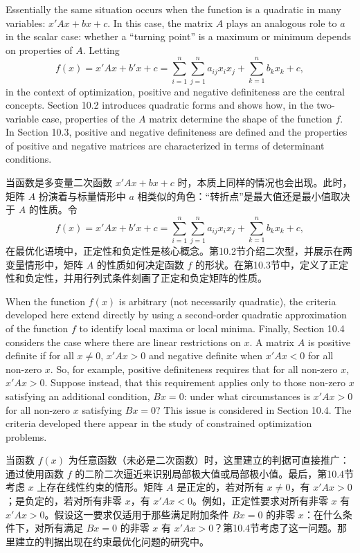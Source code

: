 \begin{original}
Essentially the same situation occurs when the function is a quadratic in many variables: $x'Ax + bx + c$. In this case, the matrix $A$ plays an analogous role to $a$ in the scalar case: whether a ``turning point'' is a maximum or minimum depends on properties of $A$. Letting
\[
f(x) = x'Ax + b'x + c = \sum_{i=1}^n \sum_{j=1}^n a_{ij} x_i x_j + \sum_{k=1}^n b_k x_k + c,
\]
in the context of optimization, positive and negative definiteness are the central concepts. Section 10.2 introduces quadratic forms and shows how, in the two-variable case, properties of the $A$ matrix determine the shape of the function $f$. In Section 10.3, positive and negative definiteness are defined and the properties of positive and negative matrices are characterized in terms of determinant conditions.
\end{original}
\begin{translation}
当函数是多变量二次函数 $x'Ax + bx + c$ 时，本质上同样的情况也会出现。此时，矩阵 $A$ 扮演着与标量情形中 $a$ 相类似的角色：``转折点''是最大值还是最小值取决于 $A$ 的性质。令
\[
f(x) = x'Ax + b'x + c = \sum_{i=1}^n \sum_{j=1}^n a_{ij} x_i x_j + \sum_{k=1}^n b_k x_k + c,
\]
在最优化语境中，正定性和负定性是核心概念。第10.2节介绍二次型，并展示在两变量情形中，矩阵 $A$ 的性质如何决定函数 $f$ 的形状。在第10.3节中，定义了正定性和负定性，并用行列式条件刻画了正定和负定矩阵的性质。
\end{translation}

\begin{original}
When the function $f(x)$ is arbitrary (not necessarily quadratic), the criteria developed here extend directly by using a second-order quadratic approximation of the function $f$ to identify local maxima or local minima. Finally, Section 10.4 considers the case where there are linear restrictions on $x$. A matrix $A$ is positive definite if for all $x \neq 0$, $x'Ax > 0$ and negative definite when $x'Ax < 0$ for all non-zero $x$. So, for example, positive definiteness requires that for all non-zero $x$, $x'Ax > 0$. Suppose instead, that this requirement applies only to those non-zero $x$ satisfying an additional condition, $Bx = 0$: under what circumstances is $x'Ax > 0$ for all non-zero $x$ satisfying $Bx = 0$? This issue is considered in Section 10.4. The criteria developed there appear in the study of constrained optimization problems.
\end{original}
\begin{translation}
当函数 $f(x)$ 为任意函数（未必是二次函数）时，这里建立的判据可直接推广：通过使用函数 $f$ 的二阶二次逼近来识别局部极大值或局部极小值。最后，第10.4节考虑 $x$ 上存在线性约束的情形。矩阵 $A$ 是正定的，若对所有 $x \neq 0$，有 $x'Ax > 0$；是负定的，若对所有非零 $x$，有 $x'Ax < 0$。例如，正定性要求对所有非零 $x$ 有 $x'Ax > 0$。假设这一要求仅适用于那些满足附加条件 $Bx = 0$ 的非零 $x$：在什么条件下，对所有满足 $Bx = 0$ 的非零 $x$ 有 $x'Ax > 0$？第10.4节考虑了这一问题。那里建立的判据出现在约束最优化问题的研究中。
\end{translation}

